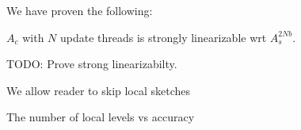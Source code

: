 We have proven the following:

\begin{lemma}%
$A_c$  with $N$ update threads is strongly linearizable wrt $A^{2Nb}_s$.
\label{lemma:quantiles-strong}
\end{lemma}


TODO: Prove strong linearizabilty.

We allow reader to skip local sketches

The number of local levels vs accuracy 
